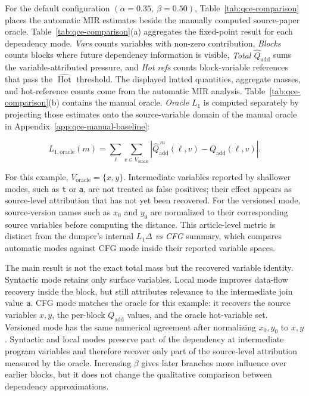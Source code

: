 \documentclass[conference]{IEEEtran}
\begin{document}
For the default configuration \((\alpha=0.35,\ \beta=0.50)\),
Table~\ref{tab:qce-comparison} places the automatic MIR estimates beside the
manually computed source-paper oracle. Table~\ref{tab:qce-comparison}(a)
aggregates the fixed-point result for each dependency mode. \textit{Vars} counts variables
with non-zero contribution, \textit{Blocks} counts blocks where future
dependency information is visible, \textit{Total \(\widehat{Q}_{\mathrm{add}}\)}
sums the variable-attributed pressure, and \textit{Hot refs} counts
block-variable references that pass the \(\widehat{\operatorname{Hot}}\)
threshold. The displayed hatted quantities, aggregate masses, and hot-reference
counts come from the automatic MIR analysis. Table~\ref{tab:qce-comparison}(b)
contains the manual oracle. \textit{Oracle \(L_1\)} is
computed separately by projecting those estimates onto the source-variable
domain of the manual oracle in Appendix~\ref{app:qce-manual-baseline}:

\[
L_{1,\mathrm{oracle}}(m)
=
\sum_{\ell}
\sum_{v\in V_{\mathrm{oracle}}}
\left|
\widehat{Q}_{\mathrm{add}}^{\,m}(\ell,v)
-
Q_{\mathrm{add}}(\ell,v)
\right|.
\]

For this example, \(V_{\mathrm{oracle}}=\{x,y\}\). Intermediate variables
reported by shallower modes, such as \texttt{t} or \texttt{a}, are not treated
as false positives; their effect appears as source-level attribution that has
not yet been recovered. For the versioned mode, source-version names such as
\(x_0\) and \(y_0\) are normalized to their corresponding source variables
before computing the distance. This article-level metric is distinct from the
dumper's internal \textit{\(L_1\Delta\) vs CFG} summary, which compares
automatic modes against CFG mode inside their reported variable spaces.

The main result is not the exact total mass but the recovered variable
identity. Syntactic mode retains only surface variables. Local mode improves
data-flow recovery inside the block, but still attributes relevance to the
intermediate join value \texttt{a}. CFG mode matches the oracle for this
example: it recovers the source variables \(x,y\), the per-block
\(Q_{\mathrm{add}}\) values, and the oracle hot-variable set. Versioned mode
has the same numerical agreement after normalizing \(x_0,y_0\) to \(x,y\).
Syntactic and local modes preserve part of the dependency at intermediate
program variables and therefore recover only part of the source-level
attribution measured by the oracle. Increasing \(\beta\) gives later branches
more influence over earlier blocks, but it does not change the qualitative
comparison between dependency approximations.
\end{document}
